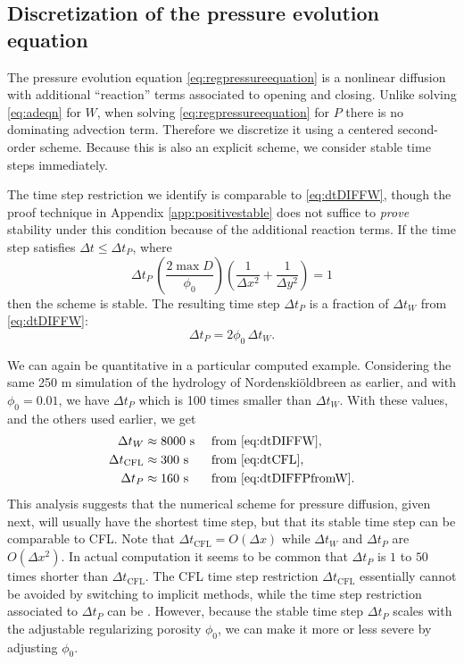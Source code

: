\documentclass[11pt,final]{amsart}
\newcommand{\Nbreen}{Nordenski\"oldbreen\xspace}
\begin{document}
\subsection*{Discretization of the pressure evolution equation}  The pressure evolution equation \eqref{eq:regpressureequation} is a nonlinear diffusion with additional ``reaction'' terms associated to opening and closing.  Unlike solving \eqref{eq:adeqn} for $W$, when solving \eqref{eq:regpressureequation} for $P$ there is no dominating advection term.  Therefore we discretize it using a centered second-order scheme.  Because this is also an explicit scheme, we consider stable time steps immediately.

The time step restriction we identify is comparable to \eqref{eq:dtDIFFW}, though the proof technique in Appendix \ref{app:positivestable} does not suffice to \emph{prove} stability under this condition because of the additional reaction terms.  If the time step satisfies $\Delta t \le \Delta t_P$, where
\begin{equation}
\Delta t_P\, \left(\frac{2 \max D}{\phi_0}\right) \left(\frac{1}{\Delta x^2} + \frac{1}{\Delta y^2}\right) = 1 \label{eq:dtDIFFP}
\end{equation}
then the scheme is stable.  The resulting time step $\Delta t_P$ is a fraction of $\Delta t_W$ from \eqref{eq:dtDIFFW}:
\begin{equation}
\Delta t_P = 2 \phi_0\, \Delta t_W.  \label{eq:dtDIFFPfromW}
\end{equation}

We can again be quantitative in a particular computed example.  Considering the same 250 m simulation of the hydrology of \Nbreen as earlier, and with $\phi_0 = 0.01$, we have $\Delta t_P$ which is 100 times smaller than $\Delta t_W$.  With these values, and the others used earlier, we get
\begin{align*}
  \Delta t_W            &\approx 8000 \text{ s} &&\text{ from \eqref{eq:dtDIFFW}}, \\
  \Delta t_{\text{CFL}} &\approx 300  \text{ s} &&\text{ from \eqref{eq:dtCFL}}, \\
  \Delta t_P            &\approx 160  \text{ s} &&\text{ from \eqref{eq:dtDIFFPfromW}.}
\end{align*}
This analysis suggests that the numerical scheme for pressure diffusion, given next, will usually have the shortest time step, but that its stable time step can be comparable to CFL.  Note that $\Delta t_{\text{CFL}}=O(\Delta x)$ while $\Delta t_W$ and $\Delta t_P$ are $O(\Delta x^2)$.  In actual computation it seems to be common that $\Delta t_P$ is $1$ to $50$ times shorter than $\Delta t_{\text{CFL}}$.  The CFL time step restriction $\Delta t_{\text{CFL}}$ essentially cannot be avoided by switching to implicit methods, while the time step restriction associated to $\Delta t_P$ can be \citep{Schoofetal2012,Hewittetal2012}.  However, because the stable time step $\Delta t_P$ scales with the adjustable regularizing porosity $\phi_0$, we can make it more or less severe by adjusting $\phi_0$.
\end{document}
